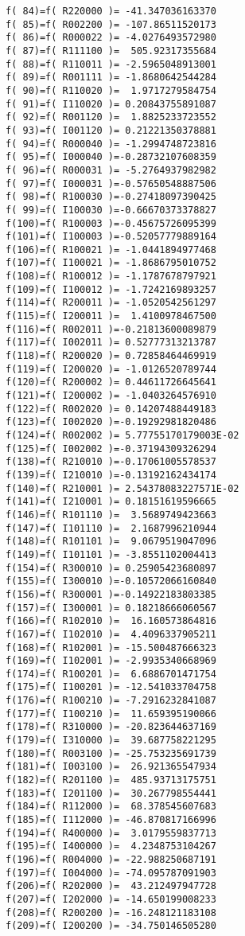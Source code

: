 \begin{footnotesize}
\begin{verbatim}
f( 84)=f( R220000 )= -41.347036163370
f( 85)=f( R002200 )= -107.86511520173
f( 86)=f( R000022 )= -4.0276493572980
f( 87)=f( R111100 )=  505.92317355684
f( 88)=f( R110011 )= -2.5965048913001
f( 89)=f( R001111 )= -1.8680642544284
f( 90)=f( R110020 )=  1.9717279584754
f( 91)=f( I110020 )= 0.20843755891087
f( 92)=f( R001120 )=  1.8825233723552
f( 93)=f( I001120 )= 0.21221350378881
f( 94)=f( R000040 )= -1.2994748723816
f( 95)=f( I000040 )=-0.28732107608359
f( 96)=f( R000031 )= -5.2764937982982
f( 97)=f( I000031 )=-0.57650548887506
f( 98)=f( R100030 )=-0.27418097390425
f( 99)=f( I100030 )=-0.66670373378827
f(100)=f( R100003 )=-0.45675726095399
f(101)=f( I100003 )=-0.52057779889164
f(106)=f( R100021 )= -1.0441894977468
f(107)=f( I100021 )= -1.8686795010752
f(108)=f( R100012 )= -1.1787678797921
f(109)=f( I100012 )= -1.7242169893257
f(114)=f( R200011 )= -1.0520542561297
f(115)=f( I200011 )=  1.4100978467500
f(116)=f( R002011 )=-0.21813600089879
f(117)=f( I002011 )= 0.52777313213787
f(118)=f( R200020 )= 0.72858464469919
f(119)=f( I200020 )= -1.0126520789744
f(120)=f( R200002 )= 0.44611726645641
f(121)=f( I200002 )= -1.0403264576910
f(122)=f( R002020 )= 0.14207488449183
f(123)=f( I002020 )=-0.19292981820486
f(124)=f( R002002 )= 5.77755170179003E-02
f(125)=f( I002002 )=-0.37194309326294
f(138)=f( R210010 )=-0.17061005578537
f(139)=f( I210010 )=-0.13192162434174
f(140)=f( R210001 )= 2.54378083227571E-02
f(141)=f( I210001 )= 0.18151619596665
f(146)=f( R101110 )=  3.5689749423663
f(147)=f( I101110 )=  2.1687996210944
f(148)=f( R101101 )=  9.0679519047096
f(149)=f( I101101 )= -3.8551102004413
f(154)=f( R300010 )= 0.25905423680897
f(155)=f( I300010 )=-0.10572066160840
f(156)=f( R300001 )=-0.14922183803385
f(157)=f( I300001 )= 0.18218666060567
f(166)=f( R102010 )=  16.160573864816
f(167)=f( I102010 )=  4.4096337905211
f(168)=f( R102001 )= -15.500487666323
f(169)=f( I102001 )= -2.9935340668969
f(174)=f( R100201 )=  6.6886701471754
f(175)=f( I100201 )= -12.541033704758
f(176)=f( R100210 )= -7.2916232841087
f(177)=f( I100210 )=  11.659395190066
f(178)=f( R310000 )= -20.823644637169
f(179)=f( I310000 )=  39.687758221295
f(180)=f( R003100 )= -25.753235691739
f(181)=f( I003100 )=  26.921365547934
f(182)=f( R201100 )=  485.93713175751
f(183)=f( I201100 )=  30.267798554441
f(184)=f( R112000 )=  68.378545607683
f(185)=f( I112000 )= -46.870817166996
f(194)=f( R400000 )=  3.0179559837713
f(195)=f( I400000 )=  4.2348753104267
f(196)=f( R004000 )= -22.988250687191
f(197)=f( I004000 )= -74.095787091903
f(206)=f( R202000 )=  43.212497947728
f(207)=f( I202000 )= -14.650199008233
f(208)=f( R200200 )= -16.248121183108
f(209)=f( I200200 )= -34.750146505280
\end{verbatim}
\end{footnotesize}

